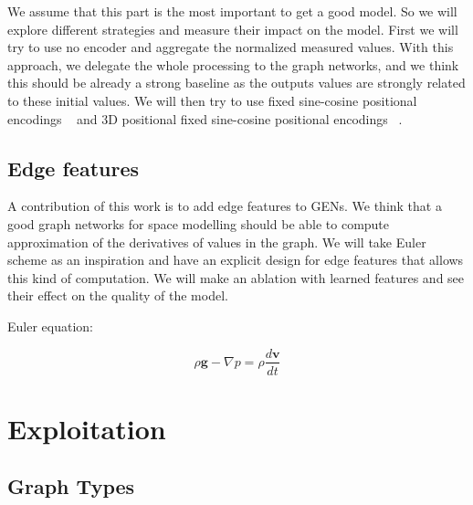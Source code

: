 \documentclass[a4paper,10pt]{article}
\newcommand{\ap}[1]{\marginpar{{\tiny \color{red} [AP] #1}}}
\begin{document}
We assume that this part is the most important to get a good model. So we will explore different strategies and measure their impact on the model. First we will try to use no encoder and aggregate the normalized measured values. With this approach, we delegate the whole processing to the graph networks, and we think this should be already a strong baseline as the outputs values are strongly related to these initial values. We will then try to use fixed sine-cosine positional encodings ~\cite{vaswani2017attention} and 3D positional fixed sine-cosine positional encodings ~\cite{chu2021conditional}.

\subsection{Edge features}
A contribution of this work is to add edge features to GENs. We think that a good graph networks for space modelling should be able to compute approximation of the derivatives of values in the graph. We will take Euler scheme as an inspiration and have an explicit design for edge features that allows this kind of computation. We will make an ablation with learned features and see their effect on the quality of the model.
\ap{TODO: sketch}


Euler equation:

\begin{equation}
  \rho \mathbf{g} - \nabla p = \rho\frac{d\mathbf{v}}{dt}
\end{equation}


\section{Exploitation}

\subsection{Graph Types}
\end{document}

